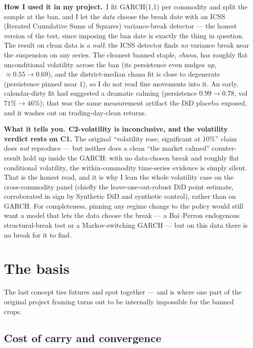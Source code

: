 \documentclass[11pt]{article}
\newcommand{\applied}{\smallskip\noindent\textbf{How I used it in my project.}\ }
\newcommand{\tells}{\smallskip\noindent\textbf{What it tells you.}\ }
\begin{document}
\applied I fit GARCH(1,1) per commodity and split the sample at the ban, and I let the \emph{data}
choose the break date with an ICSS (Iterated Cumulative Sums of Squares) variance-break detector ---
the honest version of the test, since imposing the ban date is exactly the thing in question. The
result on clean data is a \emph{null}: the ICSS detector finds \emph{no} variance break near the
suspension on any series. The cleanest banned staple, \emph{chana}, has roughly flat unconditional
volatility across the ban (its persistence even nudges \emph{up}, $\approx 0.55 \to 0.69$), and the
district-median chana fit is close to degenerate (persistence pinned near $1$), so I do not read fine
movements into it. An early, calendar-dirty fit had suggested a dramatic calming (persistence
$0.99 \to 0.78$, vol $71\% \to 46\%$); that was the same measurement artifact the DiD placebo exposed,
and it washes out on trading-day-clean returns.

\tells \textbf{C2-volatility is inconclusive, and the volatility verdict rests on C1.} The original
``volatility rose, significant at $10\%$'' claim does \emph{not} reproduce --- but neither does a
clean ``the market calmed'' counter-result hold up inside the GARCH: with no data-chosen break and
roughly flat conditional volatility, the within-commodity time-series evidence is simply silent. That
is the honest read, and it is why I lean the whole volatility case on the cross-commodity panel
(chiefly the leave-one-out-robust DiD point estimate, corroborated in sign by Synthetic DiD and
synthetic control), rather than on GARCH.
For completeness, pinning any regime change to the policy would still want a model that lets the data
choose the break --- a Bai--Perron endogenous structural-break test or a Markov-switching GARCH ---
but on this data there is no break for it to find.

\section{The basis}

The last concept ties futures and spot together --- and is where one part of the original project
framing turns out to be internally impossible for the banned crops.

\subsection{Cost of carry and convergence}
\end{document}
